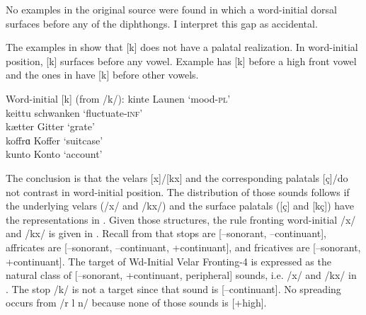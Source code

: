 No examples in the original source were found in which a word-initial dorsal  surfaces before any of the diphthongs. I interpret this gap as accidental.

The examples in  show that [k] does not have a palatal realization. In word-initial position, [k] surfaces before any vowel. Example  has [k] before a high front vowel and the ones in  have [k] before other vowels.

\ea%
\label{ex:6:23}Word-initial [k] (from /k/):
\ea\label{ex:6:23a} kinte  \tab [kinte]  \tab Launen    \tab ‘mood-\textsc{pl}’                  \\
\ex\label{ex:6:23b} keittu \tab [keittu] \tab schwanken \tab ‘fluctuate-\textsc{inf}’ \\
    kætter \tab [kætter] \tab Gitter    \tab ‘grate’                  \\
    koffrɑ \tab [koffrɑ] \tab Koffer    \tab ‘suitcase’               \\
    kunto  \tab [kunto]  \tab Konto     \tab ‘account’                \\
\z                       
\z 

The conclusion is that the velars [x]/[kx] and the corresponding palatals [ç]\slash\relax[kç] do not contrast in word-initial position. The distribution of those sounds follows if the underlying velars (/x/ and /kx/) and the surface palatals ([ç] and [kç]) have the representations in . Given those structures, the rule fronting word-initial /x/ and /kx/ is given in . Recall from  that stops are [--sonorant, --continuant], affricates are [--sonorant, --continuant, +continuant], and fricatives are [--sonorant, +continuant]. The target of Wd-Initial Velar Fronting{}-4 is expressed as the natural class of [{}--sonorant, +continuant, peripheral] sounds, i.e. /x/ and /kx/ in . The stop /k/ is not a target since that sound is [--continuant]. No spreading occurs from /r l n/ because none of those sounds is [+high].

